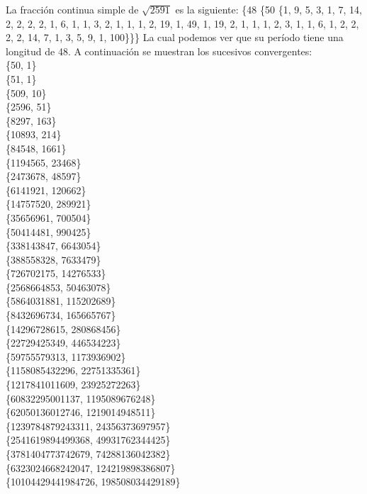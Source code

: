 \documentclass[fleqn]{article}
\begin{document}
    


    La fracción continua simple de $\sqrt{2591}$ es la siguiente:
    \{48 \{50 \{1, 9, 5, 3, 1, 7, 14, 2, 2, 2, 2, 1, 6, 1, 1, 3, 2, 1, 1, 1, 2, 19, 1, 49, 1, 19, 2, 1, 1, 1, 2, 3, 1, 1, 6, 1, 2, 2, 2, 
    2, 14, 7, 1, 3, 5, 9, 1, 100\}\}\}
    La cual podemos ver que su período tiene una longitud de 48. A continuación se muestran los sucesivos convergentes: \\
    \{50, 1\} \\
    \{51, 1\} \\ 
    \{509, 10\} \\ 
    \{2596, 51\} \\ 
    \{8297, 163\} \\ 
    \{10893, 214\} \\ 
    \{84548, 1661\} \\ 
    \{1194565, 23468\} \\
    \{2473678, 48597\} \\ 
    \{6141921, 120662\} \\
    \{14757520, 289921\} \\
    \{35656961, 700504\} \\
    \{50414481, 990425\} \\
    \{338143847, 6643054\} \\
    \{388558328, 7633479\} \\
    \{726702175, 14276533\} \\
    \{2568664853, 50463078\} \\
    \{5864031881, 115202689\} \\
    \{8432696734, 165665767\} \\
    \{14296728615, 280868456\} \\
    \{22729425349, 446534223\} \\
    \{59755579313, 1173936902\} \\
    \{1158085432296, 22751335361\} \\ 
    \{1217841011609, 23925272263\} \\
    \{60832295001137, 1195089676248\} \\ 
    \{62050136012746, 1219014948511\} \\
    \{1239784879243311, 24356373697957\} \\ 
    \{2541619894499368, 49931762344425\} \\
    \{3781404773742679, 74288136042382\} \\
    \{6323024668242047, 124219898386807\} \\
    \{10104429441984726, 198508034429189\} \\
\end{document}
